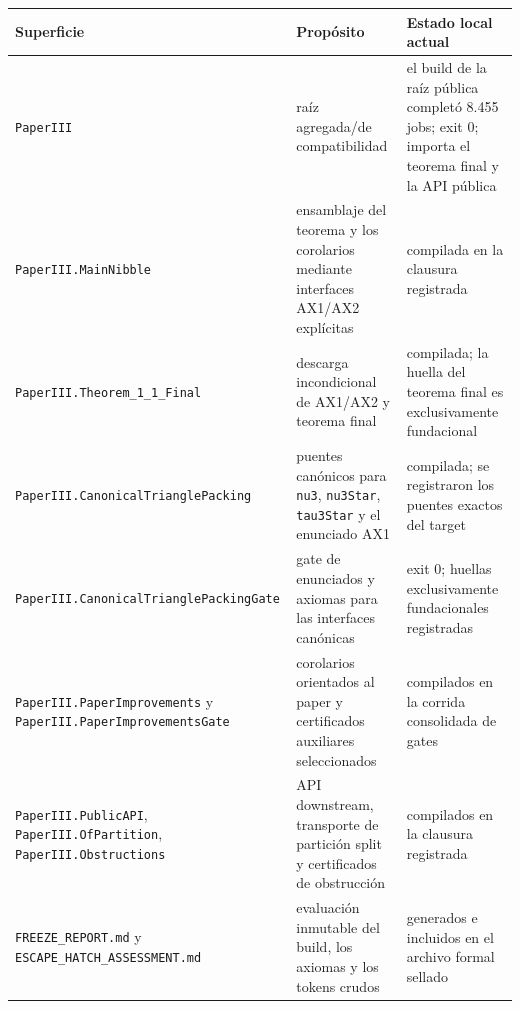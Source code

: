 \documentclass[spanish,11pt,a4paper]{article}
\newcounter{none}
\begin{document}
{\def\LTcaptype{none} %
\begin{longtable}[]{@{}
  >{\raggedright\arraybackslash}p{}
  >{\raggedright\arraybackslash}p{}
  >{\raggedright\arraybackslash}p{}@{}}
\toprule\noalign{}
\begin{minipage}[b]{\linewidth}\raggedright
Superficie
\end{minipage} & \begin{minipage}[b]{\linewidth}\raggedright
Propósito
\end{minipage} & \begin{minipage}[b]{\linewidth}\raggedright
Estado local actual
\end{minipage} \\
\midrule\noalign{}
\endhead
\bottomrule\noalign{}
\endlastfoot
\nolinkurl{PaperIII} & raíz agregada/de compatibilidad & el build de la
raíz pública completó 8.455 jobs; exit 0; importa el teorema final y la
API pública \\
\nolinkurl{PaperIII.MainNibble} & ensamblaje del teorema y los corolarios
mediante interfaces AX1/AX2 explícitas & compilada en la clausura
registrada \\
\nolinkurl{PaperIII.Theorem_1_1_Final} & descarga incondicional de
AX1/AX2 y teorema final & compilada; la huella del teorema final es
exclusivamente fundacional \\
\nolinkurl{PaperIII.CanonicalTrianglePacking} & puentes canónicos para
\nolinkurl{nu3}, \nolinkurl{nu3Star}, \nolinkurl{tau3Star} y el enunciado AX1 &
compilada; se registraron los puentes exactos del target \\
\nolinkurl{PaperIII.CanonicalTrianglePackingGate} & gate de enunciados y
axiomas para las interfaces canónicas & exit 0; huellas exclusivamente
fundacionales registradas \\
\nolinkurl{PaperIII.PaperImprovements} y
\nolinkurl{PaperIII.PaperImprovementsGate} & corolarios orientados al paper
y certificados auxiliares seleccionados & compilados en la corrida
consolidada de gates \\
\nolinkurl{PaperIII.PublicAPI}, \nolinkurl{PaperIII.OfPartition},
\nolinkurl{PaperIII.Obstructions} & API downstream, transporte de partición
split y certificados de obstrucción & compilados en la clausura
registrada \\
\nolinkurl{FREEZE_REPORT.md} y \nolinkurl{ESCAPE_HATCH_ASSESSMENT.md} &
evaluación inmutable del build, los axiomas y los tokens crudos &
generados e incluidos en el archivo formal sellado \\
\end{longtable}
}
\end{document}
